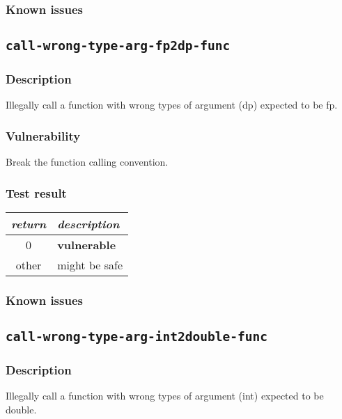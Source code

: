 \documentclass[a4paper]{book}
\begin{document}
\subsubsection{Known issues}


\newpage

\subsection{\texttt{call-wrong-type-arg-fp2dp-func}}\label{test-call-wrong-type-arg-fp2dp-func}

\subsubsection{Description}
Illegally call a function with wrong types of argument (dp)  expected to be fp.

\subsubsection{Vulnerability}
Break the function calling convention.

\subsubsection{Test result}
\begin{tabular}{cl}
  \toprule
  \emph{return}  & \emph{description} \\
  \midrule
  0              & \textbf{vulnerable} \\
  other          & might be safe \\
  \bottomrule
\end{tabular}

\subsubsection{Known issues}

\newpage
\subsection{\texttt{call-wrong-type-arg-int2double-func}}\label{test-call-wrong-type-arg-int2double-func}

\subsubsection{Description}
Illegally call a function with wrong types of argument (int) expected to be double.
\end{document}
